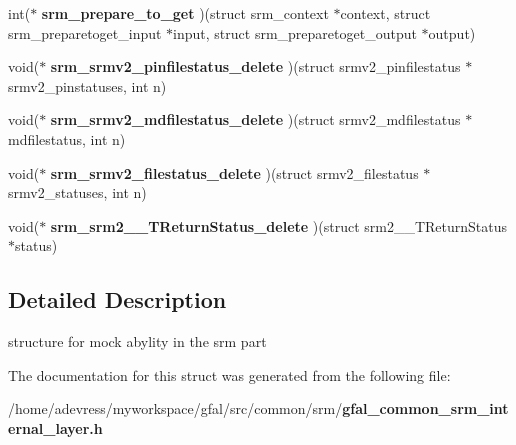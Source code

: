 \begin{CompactItemize}
\item 
int($\ast$ \textbf{srm\_\-prepare\_\-to\_\-get} )(struct srm\_\-context $\ast$context, struct srm\_\-preparetoget\_\-input $\ast$input, struct srm\_\-preparetoget\_\-output $\ast$output)\label{struct__gfal__srm__external__call_25c2f8ab6c8702cec864d41cc86a502d}

\item 
void($\ast$ \textbf{srm\_\-srmv2\_\-pinfilestatus\_\-delete} )(struct srmv2\_\-pinfilestatus $\ast$srmv2\_\-pinstatuses, int n)\label{struct__gfal__srm__external__call_755de3bb11627d248e340aec4f6db49b}

\item 
void($\ast$ \textbf{srm\_\-srmv2\_\-mdfilestatus\_\-delete} )(struct srmv2\_\-mdfilestatus $\ast$mdfilestatus, int n)\label{struct__gfal__srm__external__call_8334ed4e5c1835eeb209c02d68f39939}

\item 
void($\ast$ \textbf{srm\_\-srmv2\_\-filestatus\_\-delete} )(struct srmv2\_\-filestatus $\ast$srmv2\_\-statuses, int n)\label{struct__gfal__srm__external__call_a3bd168b26c0c5b613f2ebd66d903fb2}

\item 
void($\ast$ \textbf{srm\_\-srm2\_\-\_\-TReturn\-Status\_\-delete} )(struct srm2\_\-\_\-TReturn\-Status $\ast$status)\label{struct__gfal__srm__external__call_d3600d77afae102a47cc323f60da5d3d}

\end{CompactItemize}


\subsection{Detailed Description}
structure for mock abylity in the srm part 



The documentation for this struct was generated from the following file:\begin{CompactItemize}
\item 
/home/adevress/myworkspace/gfal/src/common/srm/\bf{gfal\_\-common\_\-srm\_\-internal\_\-layer.h}\end{CompactItemize}
